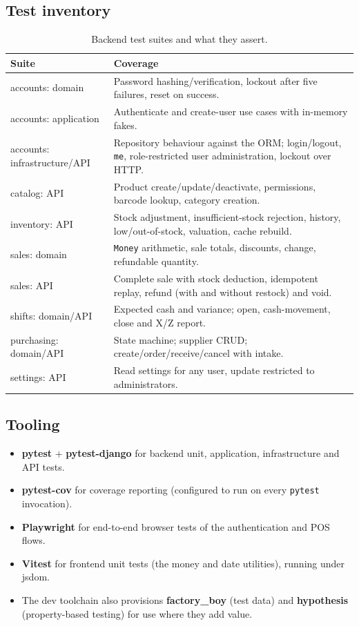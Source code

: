 \documentclass[11pt,a4paper]{article}
\begin{document}
\subsection{Test inventory}

\begin{table}[htbp]\centering
\small
\caption{Backend test suites and what they assert.}
\begin{tabular}{@{}p{}p{}@{}}
\toprule
\textbf{Suite} & \textbf{Coverage} \\
\midrule
accounts: domain & Password hashing/verification, lockout after five failures, reset on success. \\
accounts: application & Authenticate and create-user use cases with in-memory fakes. \\
accounts: infrastructure/API & Repository behaviour against the ORM; login/logout, \texttt{me},
role-restricted user administration, lockout over HTTP. \\
catalog: API & Product create/update/deactivate, permissions, barcode lookup, category creation. \\
inventory: API & Stock adjustment, insufficient-stock rejection, history, low/out-of-stock,
valuation, cache rebuild. \\
sales: domain & \texttt{Money} arithmetic, sale totals, discounts, change, refundable quantity. \\
sales: API & Complete sale with stock deduction, idempotent replay, refund (with and without
restock) and void. \\
shifts: domain/API & Expected cash and variance; open, cash-movement, close and X/Z report. \\
purchasing: domain/API & State machine; supplier CRUD; create/order/receive/cancel with intake. \\
settings: API & Read settings for any user, update restricted to administrators. \\
\bottomrule
\end{tabular}
\end{table}

\subsection{Tooling}

\begin{itemize}[leftmargin=1.4em]
  \item \textbf{pytest} + \textbf{pytest-django} for backend unit, application, infrastructure and API tests.
  \item \textbf{pytest-cov} for coverage reporting (configured to run on every \texttt{pytest} invocation).
  \item \textbf{Playwright} for end-to-end browser tests of the authentication and POS flows.
  \item \textbf{Vitest} for frontend unit tests (the money and date utilities), running under jsdom.
  \item The dev toolchain also provisions \textbf{factory\_boy} (test data) and \textbf{hypothesis}
  (property-based testing) for use where they add value.
\end{itemize}
\end{document}

